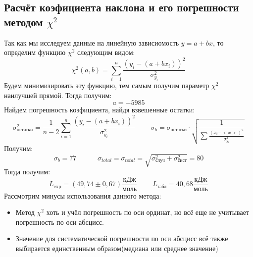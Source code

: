\documentclass[a4paper,20pt]{article}
\theoremstyle{definition}
\begin{document}
\subsection{Расчёт коэфициента наклона и его погрешности методом $\chi^2$}
Так как мы исследуем данные на линейную зависиомость $y = a + bx$, то определим функцию $\chi^2$ следующим видом:
\begin{equation}
	\chi^2(a, b) = \sum_{i=1}^{n} \frac{(y_i-(a+bx_i))^2}{\sigma^2_{y_i}}
\end{equation}
Будем минимизировать эту функцию, тем самым получим параметр $\chi^2$ наилучшей прямой. Тогда получим:
\begin{equation}
	a = - 5985
\end{equation}
Найдем погрешность коэфициента, найдя взвешенные остатки:
\begin{equation}
	\sigma_{\text{остатки}}^2 = \frac{1}{n-2} \sum_{i=1}^{n}\frac{(y_i-(a+bx_i))^2}{\sigma^2_{y_i}} \;\;\;\;\;\;\;\; \sigma_b = \sigma_{\text{остатки}}\cdot \sqrt{\frac{1}{\sum \frac{(x_i-<x>)^2}{\sigma_{y_i}^2}}}
\end{equation}
Получим:
\begin{equation}
	\sigma_b = 77 \;\;\;\;\;\;\;\;\;\;\; \sigma_{total} = \sigma_{total} = \sqrt{\sigma_{\text{случ}}^2 + \sigma_{\text{сист}}^2} = 80
\end{equation}
Тогда получим:
\begin{equation}
	L_{\text{exp}} = (49,74 \pm 0,67 ) \frac{\text{кДж}}{\text{моль}} \;\;\;\;\;\;\;\; L_{\text{табл}} = 40,68 \frac{\text{кДж}}{\text{моль}}  
\end{equation}
Рассмотрим минусы использования данного метода:
\begin{itemize}
	\item Метод $\chi^2$ хоть и учёл погрешность по оси ординат, но всё еще не учитывает погрешность по оси абсцисс.
	\item Значение для систематической погрешности по оси абсцисс всё также выбирается единственным образом(медиана или среднее значение)	
\end{itemize}
\end{document}

